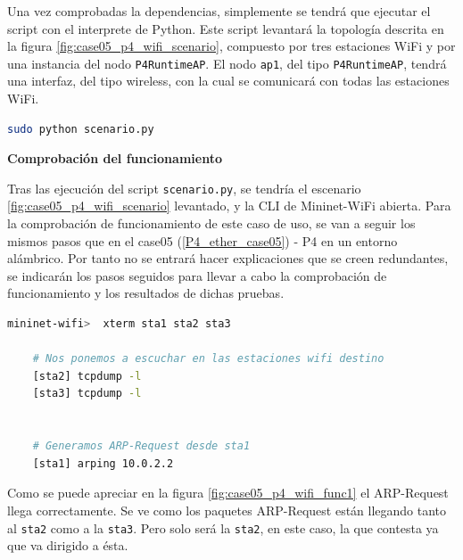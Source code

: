 Una vez comprobadas la dependencias, simplemente se tendrá que ejecutar el script con el interprete de Python. Este script levantará la topología descrita en la figura \ref{fig:case05_p4_wifi_scenario}, compuesto por tres estaciones WiFi y por una instancia del nodo \texttt{P4RuntimeAP}. El nodo \texttt{ap1}, del tipo \texttt{P4RuntimeAP}, tendrá una interfaz,  del tipo wireless, con la cual se comunicará con todas las estaciones WiFi.



\begin{lstlisting}[language= bash, style=Consola, caption={Puesta en marcha del escenario  - Case05},label=code:case05_p4_wifi_run]
    sudo python scenario.py
\end{lstlisting}
\vspace{0.2cm}

\vspace{0.5cm}
\textbf{Comprobación del funcionamiento}\\
\par


Tras las ejecución del script \texttt{scenario.py}, se tendría el escenario \ref{fig:case05_p4_wifi_scenario} levantado, y la CLI de Mininet-WiFi abierta. Para la comprobación de funcionamiento de este caso de uso, se van a seguir los mismos pasos que en el case05 (\ref{P4_ether_case05}) - P4 en un entorno alámbrico. Por tanto no se entrará hacer explicaciones que se creen redundantes, se indicarán los pasos seguidos para llevar a cabo la comprobación de funcionamiento y los resultados de dichas pruebas. 

\begin{lstlisting}[language= bash, style=Consola, caption={Pasos a seguir para comprobar el funcionamiento - Case05},label=code:case05_p4_wifi_func1]
    mininet-wifi>  xterm sta1 sta2 sta3
    
    # Nos ponemos a escuchar en las estaciones wifi destino
    [sta2] tcpdump -l
    [sta3] tcpdump -l
    
    
    # Generamos ARP-Request desde sta1
    [sta1] arping 10.0.2.2
\end{lstlisting}
\vspace{0.5cm}


Como se puede apreciar en la figura \ref{fig:case05_p4_wifi_func1} el ARP-Request llega correctamente. Se ve como los paquetes ARP-Request están llegando tanto al \texttt{sta2} como a la \texttt{sta3}. Pero solo será la \texttt{sta2}, en este caso, la que contesta ya que va dirigido a ésta. \\
\par

